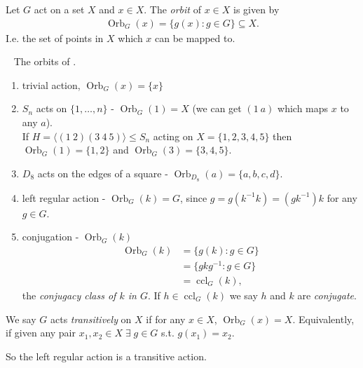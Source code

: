 \begin{definition}[Orbit] \label{def:17}
    Let $G$ act on a set $X$ and $x \in X$.
    The \emph{orbit} of $x \in X$ is given by 
    \begin{align*}
        \operatorname{Orb}_G (x) = \{g(x) : g \in G \} \subseteq X.
    \end{align*} 
    I.e. the set of points in $X$ which $x$ can be mapped to.
\end{definition} 

\begin{example} ~
    The orbits of .
    \begin{enumerate}
        \item trivial action, $\operatorname{Orb}_G (x) = \{ x \}$
        \item $S_n$ acts on $\{1, \dots, n\}$ - $\operatorname{Orb}_G(1) = X$ (we can get $(1\ a)$ which maps $x$ to any $a$). \\
        If $H = \langle (1\ 2) (3\ 4\ 5) \rangle \leq S_n$ acting on $X = \{ 1, 2, 3, 4, 5\}$ then $\operatorname{Orb}_G(1) = \{1, 2\}$ and $\operatorname{Orb}_G(3) = \{3, 4, 5\}$.
        \item $D_8$ acts on the edges of a square - $\operatorname{Orb}_{D_8}(a) = \{a, b, c, d\}$.
        \item left regular action - $\operatorname{Orb}_G(k) = G$, since $g = g(k^{-1}k) = (gk^{-1})k$ for any $g \in G$.
        \item conjugation - $\operatorname{Orb}_G(k)$
        \begin{align*}
            \operatorname{Orb}_G(k) &= \{g(k) : g \in G\} \\
            &= \{ gkg^{-1} : g \in G \} \\
            &= \operatorname{ccl}_G(k),
        \end{align*} the \emph{conjugacy class of $k$ in $G$}. If $h \in \operatorname{ccl}_G(k)$ we say $h$ and $k$ are \emph{conjugate}.
    \end{enumerate} 
\end{example} 

\begin{definition} \label{def:18}
    We say $G$ acts \emph{transitively} on $X$ if for any $x \in X$, $\operatorname{Orb}_G(x) = X$.
    Equivalently, if given any pair $x_1, x_2 \in X \; \exists \; g \in G$ s.t. $g(x_1) = x_2$.

    So the left regular action is a transitive action.
\end{definition} 

